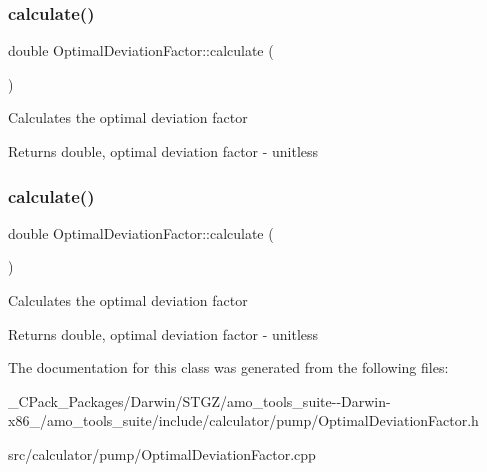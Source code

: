 \subsubsection{\texorpdfstring{calculate()}{calculate()}\hspace{0.1cm}{\footnotesize\ttfamily [2/3]}}
{\footnotesize\ttfamily double Optimal\+Deviation\+Factor\+::calculate (\begin{DoxyParamCaption}{ }\end{DoxyParamCaption})}

Calculates the optimal deviation factor

\begin{DoxyReturn}{Returns}
double, optimal deviation factor -\/ unitless 
\end{DoxyReturn}
\mbox{\label{class_optimal_deviation_factor_aaa6687bb46d275c4cbcfe44caf895a37}} 
\subsubsection{\texorpdfstring{calculate()}{calculate()}\hspace{0.1cm}{\footnotesize\ttfamily [3/3]}}
{\footnotesize\ttfamily double Optimal\+Deviation\+Factor\+::calculate (\begin{DoxyParamCaption}{ }\end{DoxyParamCaption})}

Calculates the optimal deviation factor

\begin{DoxyReturn}{Returns}
double, optimal deviation factor -\/ unitless 
\end{DoxyReturn}


The documentation for this class was generated from the following files\+:\begin{DoxyCompactItemize}
\item 
\+\_\+\+C\+Pack\+\_\+\+Packages/\+Darwin/\+S\+T\+G\+Z/amo\+\_\+tools\+\_\+suite-\/-\/\+Darwin-\/x86\+\_/amo\+\_\+tools\+\_\+suite/include/calculator/pump/Optimal\+Deviation\+Factor.\+h\item 
src/calculator/pump/Optimal\+Deviation\+Factor.\+cpp\end{DoxyCompactItemize}
